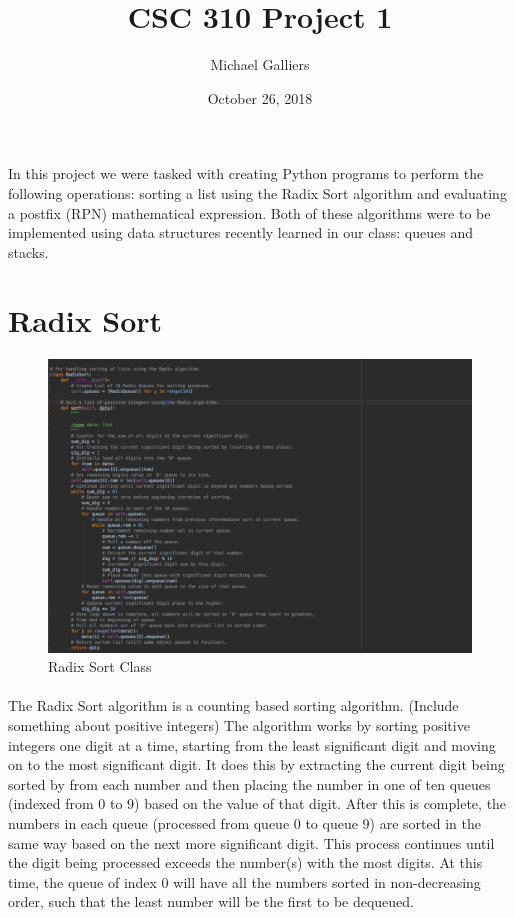 \documentclass[10pt,letterpaper]{article}
\author{Michael Galliers}
\title{CSC 310 Project 1}
\date{October 26, 2018}
\begin{document}
\begin{titlepage}
\maketitle
\end{titlepage}

\paragraph{}
In this project we were tasked with creating Python programs to perform the
following operations: sorting a list using the Radix Sort algorithm and
evaluating a postfix (RPN) mathematical expression. Both of these algorithms
were to be implemented using data structures recently learned in our class:
queues and stacks.

\section{Radix Sort}

\begin{figure}[H]
\centering
\includegraphics[width=\linewidth]{radix_sort_class.png}
\caption{Radix Sort Class}
\end{figure}

\paragraph{}
The Radix Sort algorithm is a counting based sorting algorithm. (Include
something about positive integers) The algorithm works by sorting positive
integers one digit at a time, starting from the least significant digit and
moving on to the most significant digit. It does this by extracting the current
digit being sorted by from each number and then placing the number in one of
ten queues (indexed from 0 to 9) based on the value of that digit. After this
is complete, the numbers in each queue (processed from queue 0 to queue 9) are
sorted in the same way based on the next more significant digit. This process
continues until the digit being processed exceeds the number(s) with the most
digits. At this time, the queue of index 0 will have all the numbers sorted in
non-decreasing order, such that the least number will be the first to be
dequeued.
\end{document}

